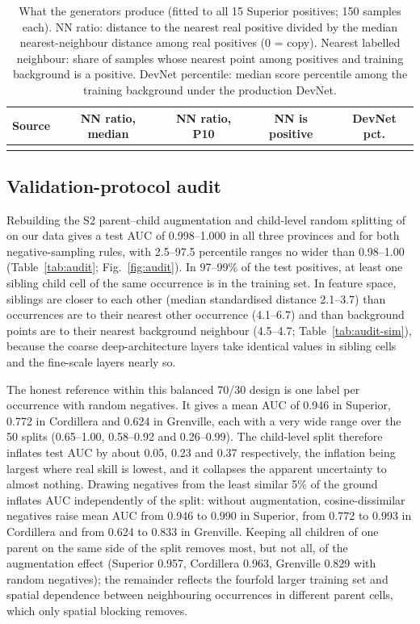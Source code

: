 \documentclass[pdflatex,sn-apa]{sn-jnl}
\begin{document}
\begin{table}[t]
\caption{What the generators produce (fitted to all 15 Superior positives; 150 samples each). NN ratio: distance to the nearest real positive divided by the median nearest-neighbour distance among real positives (0 = copy). Nearest labelled neighbour: share of samples whose nearest point among positives and training background is a positive. DevNet percentile: median score percentile among the training background under the production DevNet.}\label{tab:aug-diag}
\footnotesize
\setlength{\tabcolsep}{2.5pt}
\begin{tabular*}{\textwidth}{@{\extracolsep\fill}lcccc}
\toprule
Source & NN ratio, median & NN ratio, P10 & NN is positive & DevNet pct. \\
\midrule
\botrule
\end{tabular*}
\end{table}

\subsection{Validation-protocol audit}\label{sec:res-audit}

Rebuilding the S2 parent--child augmentation and child-level random splitting of \citet{Parsa2024} on our data gives a test AUC of 0.998--1.000 in all three provinces and for both negative-sampling rules, with 2.5--97.5 percentile ranges no wider than 0.98--1.00 (Table~\ref{tab:audit}; Fig.~\ref{fig:audit}). In 97--99\% of the test positives, at least one sibling child cell of the same occurrence is in the training set. In feature space, siblings are closer to each other (median standardised distance 2.1--3.7) than occurrences are to their nearest other occurrence (4.1--6.7) and than background points are to their nearest background neighbour (4.5--4.7; Table~\ref{tab:audit-sim}), because the coarse deep-architecture layers take identical values in sibling cells and the fine-scale layers nearly so.

The honest reference within this balanced 70/30 design is one label per occurrence with random negatives. It gives a mean AUC of 0.946 in Superior, 0.772 in Cordillera and 0.624 in Grenville, each with a very wide range over the 50 splits (0.65--1.00, 0.58--0.92 and 0.26--0.99). The child-level split therefore inflates test AUC by about 0.05, 0.23 and 0.37 respectively, the inflation being largest where real skill is lowest, and it collapses the apparent uncertainty to almost nothing. Drawing negatives from the least similar 5\% of the ground inflates AUC independently of the split: without augmentation, cosine-dissimilar negatives raise mean AUC from 0.946 to 0.990 in Superior, from 0.772 to 0.993 in Cordillera and from 0.624 to 0.833 in Grenville. Keeping all children of one parent on the same side of the split removes most, but not all, of the augmentation effect (Superior 0.957, Cordillera 0.963, Grenville 0.829 with random negatives); the remainder reflects the fourfold larger training set and spatial dependence between neighbouring occurrences in different parent cells, which only spatial blocking removes.
\end{document}
